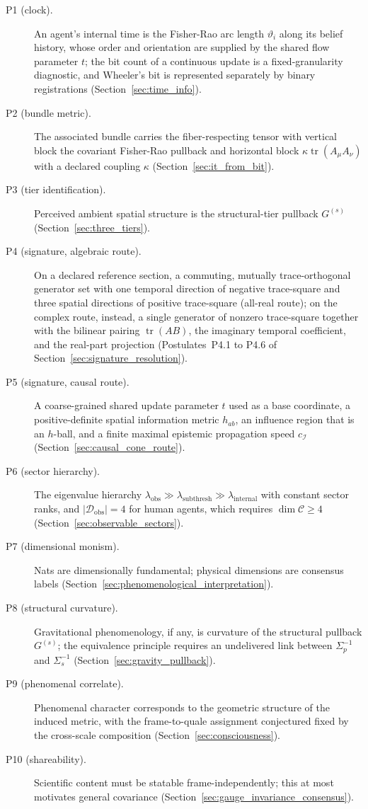 \documentclass[11pt]{article}
\begin{document}
\begin{description}
\item[P1 (clock).] An agent's internal time is the Fisher-Rao arc length $\vartheta_i$ along its belief history, whose order and orientation are supplied by the shared flow parameter $t$; the bit count of a continuous update is a fixed-granularity diagnostic, and Wheeler's bit is represented separately by binary registrations (Section~\ref{sec:time_info}).
\item[P2 (bundle metric).] The associated bundle carries the fiber-respecting tensor with vertical block the covariant Fisher-Rao pullback and horizontal block $\kappa\operatorname{tr}(A_\mu A_\nu)$ with a declared coupling $\kappa$ (Section~\ref{sec:it_from_bit}).
\item[P3 (tier identification).] Perceived ambient spatial structure is the structural-tier pullback $G^{(s)}$ (Section~\ref{sec:three_tiers}).
\item[P4 (signature, algebraic route).] On a declared reference section, a commuting, mutually trace-orthogonal generator set with one temporal direction of negative trace-square and three spatial directions of positive trace-square (all-real route); on the complex route, instead, a single generator of nonzero trace-square together with the bilinear pairing $\operatorname{tr}(AB)$, the imaginary temporal coefficient, and the real-part projection (Postulates~P4.1 to P4.6 of Section~\ref{sec:signature_resolution}).
\item[P5 (signature, causal route).] A coarse-grained shared update parameter $t$ used as a base coordinate, a positive-definite spatial information metric $h_{ab}$, an influence region that is an $h$-ball, and a finite maximal epistemic propagation speed $c_\mathcal{I}$ (Section~\ref{sec:causal_cone_route}).
\item[P6 (sector hierarchy).] The eigenvalue hierarchy $\lambda_{\text{obs}} \gg \lambda_{\text{subthresh}} \gg \lambda_{\text{internal}}$ with constant sector ranks, and $|\mathcal{D}_{\text{obs}}| = 4$ for human agents, which requires $\dim\mathcal{C} \ge 4$ (Section~\ref{sec:observable_sectors}).
\item[P7 (dimensional monism).] Nats are dimensionally fundamental; physical dimensions are consensus labels (Section~\ref{sec:phenomenological_interpretation}).
\item[P8 (structural curvature).] Gravitational phenomenology, if any, is curvature of the structural pullback $G^{(s)}$; the equivalence principle requires an undelivered link between $\Sigma_p^{-1}$ and $\Sigma_s^{-1}$ (Section~\ref{sec:gravity_pullback}).
\item[P9 (phenomenal correlate).] Phenomenal character corresponds to the geometric structure of the induced metric, with the frame-to-quale assignment conjectured fixed by the cross-scale composition (Section~\ref{sec:consciousness}).
\item[P10 (shareability).] Scientific content must be statable frame-independently; this at most motivates general covariance (Section~\ref{sec:gauge_invariance_consensus}).
\end{description}
\end{document}
